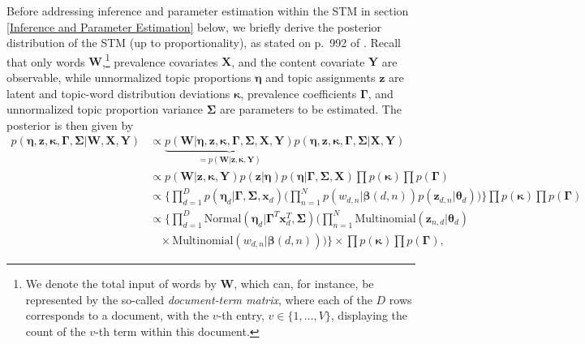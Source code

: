 Before addressing inference and parameter estimation within the STM in section \ref{Inference and Parameter Estimation} below, we briefly derive the posterior distribution of the STM (up to proportionality), as stated on p.\ 992 of \cite{roberts2016model}. Recall that only words $\boldsymbol{W}$,\footnote{We denote the total input of words by $\boldsymbol{W}$, which can, for instance, be represented by the so-called \textit{document-term matrix}, where each of the $D$ rows corresponds to a document, with the $v$-th entry, $v \in \{1, \dots, V\}$, displaying the count of the $v$-th term within this document.} prevalence covariates $\boldsymbol{X}$, and the content covariate $\boldsymbol{Y}$ are observable, while unnormalized topic proportions $\boldsymbol{\eta}$ and topic assignments $\boldsymbol{z}$ are latent and topic-word distribution deviations $\boldsymbol{\kappa}$, prevalence coefficients $\boldsymbol{\Gamma}$, and unnormalized topic proportion variance $\boldsymbol{\Sigma}$ are parameters to be estimated. The posterior is then given by
\begin{align*}
p(\boldsymbol{\eta}, \boldsymbol{z}, \boldsymbol{\kappa}, \boldsymbol{\Gamma}, \boldsymbol{\Sigma} | \boldsymbol{W}, \boldsymbol{X}, \boldsymbol{Y}) & \propto \underbrace{p(\boldsymbol{W} | \boldsymbol{\eta}, \boldsymbol{z}, \boldsymbol{\kappa}, \boldsymbol{\Gamma}, \boldsymbol{\Sigma}, \boldsymbol{X}, \boldsymbol{Y})}_{=p(\boldsymbol{W} | \boldsymbol{z}, \boldsymbol{\kappa}, \boldsymbol{Y})} p(\boldsymbol{\eta}, \boldsymbol{z}, \boldsymbol{\kappa}, \boldsymbol{\Gamma}, \boldsymbol{\Sigma} | \boldsymbol{X}, \boldsymbol{Y}) \\
& \propto p(\boldsymbol{W} | \boldsymbol{z}, \boldsymbol{\kappa}, \boldsymbol{Y}) p(\boldsymbol{z} | \boldsymbol{\eta}) p(\boldsymbol{\eta} | \boldsymbol{\Gamma}, \boldsymbol{\Sigma}, \boldsymbol{X}) \prod p(\boldsymbol{\kappa}) \prod p(\boldsymbol{\Gamma}) \\
& \propto \Big\{ \prod_{d=1}^{D} p(\boldsymbol{\eta}_d | \boldsymbol{\Gamma}, \boldsymbol{\Sigma}, \boldsymbol{x}_d) \Big( \prod_{n=1}^{N} p(w_{d,n} | \boldsymbol{\beta}(d,n)) p(\boldsymbol{z}_{d,n} | \boldsymbol{\theta}_d) \Big) \Big\} \prod p(\boldsymbol{\kappa}) \prod p(\boldsymbol{\Gamma}) \\
& \propto \Big\{ \prod_{d=1}^{D} \text{Normal}(\boldsymbol{\eta}_d | \boldsymbol{\Gamma}^T\boldsymbol{x}_d^T, \boldsymbol{\Sigma}) \Big( \prod_{n=1}^{N} \text{Multinomial}(\boldsymbol{z}_{n,d}| \boldsymbol{\theta}_d) \\
& \ \ \ \ \times \text{Multinomial}(w_{d,n} | \boldsymbol{\beta}(d,n)) \Big) \Big\} \times \prod p(\boldsymbol{\kappa}) \prod p(\boldsymbol{\Gamma}),
\end{align*}

